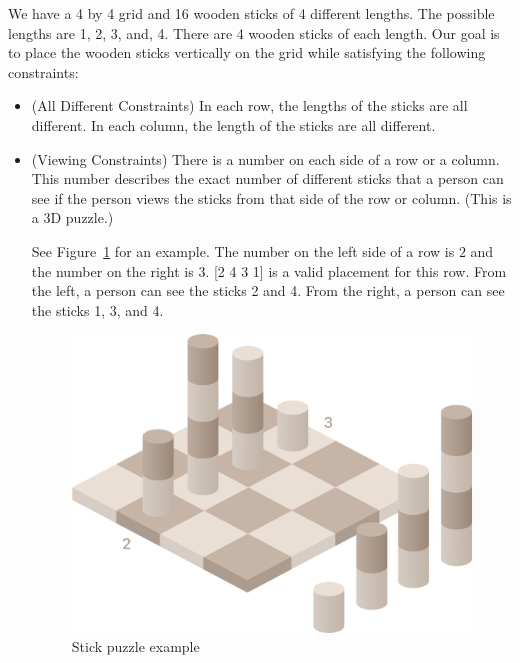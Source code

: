 \documentclass[12pt]{article}
\begin{document}
We have a 4 by 4 grid and 16 wooden sticks of 4 different lengths. The possible lengths are 1, 2, 3, and, 4. There are 4 wooden sticks of each length. Our goal is to place the wooden sticks vertically on the grid while satisfying the following constraints:
\begin{itemize}

\item (All Different Constraints) In each row, the lengths of the sticks are all different. In each column, the length of the sticks are all different.
    
\item (Viewing Constraints) There is a number on each side of a row or a column. This number describes the exact number of different sticks that a person can see if the person views the sticks from that side of the row or column. (This is a 3D puzzle.)
    
See Figure~\ref{fig:stick_puzzle_example} for an example. 
The number on the left side of a row is $2$ and the number on the right is $3$. [2 4 3 1] is a valid placement for this row. From the left, a person can see the sticks 2 and 4. From the right, a person can see the sticks 1, 3, and 4. 
    
\begin{figure}[ht!]
    \centering
    \includegraphics[scale=0.15]{images_posted/stick_puzzle.png}
    \caption{Stick puzzle example}
    \label{fig:stick_puzzle_example}
\end{figure}

    
\end{itemize}
\end{document}
